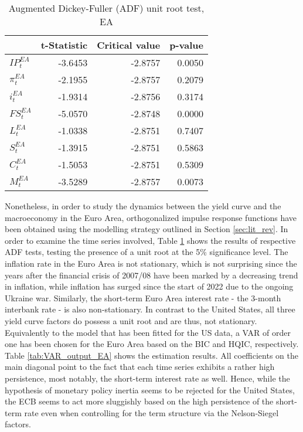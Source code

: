 


\begin{table}[ht]
    \centering
    \begin{tabular}{lrrr}
        \toprule
        {} &  t-Statistic &  Critical value &  p-value \\
        \midrule
        $IP^{EA}_{t}$  &      -3.6453 &         -2.8757 &   0.0050 \\
        $\pi^{EA}_{t}$ &      -2.1955 &         -2.8757 &   0.2079 \\
        $i^{EA}_{t}$   &      -1.9314 &         -2.8756 &   0.3174 \\
        $FS^{EA}_{t}$  &      -5.0570 &         -2.8748 &   0.0000 \\
        $L^{EA}_{t}$   &      -1.0338 &         -2.8751 &   0.7407 \\
        $S^{EA}_{t}$   &      -1.3915 &         -2.8751 &   0.5863 \\
        $C^{EA}_{t}$   &      -1.5053 &         -2.8751 &   0.5309 \\
        $M^{EA}_{t}$   &      -3.5289 &         -2.8757 &   0.0073 \\
        \bottomrule
    \end{tabular}
    \caption{Augmented Dickey-Fuller (ADF) unit root test, EA}
    \label{tab:adf_ea}
\end{table}


Nonetheless, in order to study the dynamics between the yield curve and the macroeconomy in the Euro Area, orthogonalized impulse response functions have been obtained using the modelling strategy outlined in Section \ref{sec:lit_rev}. 
In order to examine the time series involved, Table \ref{tab:adf_ea} shows the results of respective ADF tests, testing the presence of a unit root at the 5\% significance level. 
The inflation rate in the Euro Area is not stationary, which is not surprising since the years after the financial crisis of 2007/08 have been marked by a decreasing trend in inflation, while inflation has surged since the start of 2022 due to the ongoing Ukraine war. 
Similarly, the short-term Euro Area interest rate - the 3-month interbank rate - is also non-stationary.
In contrast to the United States, all three yield curve factors do possess a unit root and are thus, not stationary. 
Equivalently to the model that has been fitted for the US data, a VAR of order one has been chosen for the Euro Area based on the BIC and HQIC, respectively. 
Table \ref{tab:VAR_output_EA} shows the estimation results. 
All coefficients on the main diagonal point to the fact that each time series exhibits a rather high persistence, most notably, the short-term interest rate as well. 
Hence, while the hypothesis of monetary policy inertia seems to be rejected for the United States, the ECB seems to act more sluggishly based on the high persistence of the short-term rate even when controlling for the term structure via the Nelson-Siegel factors. 

